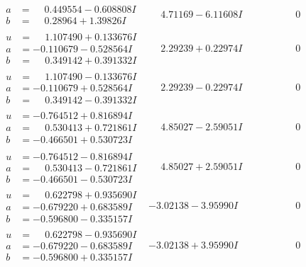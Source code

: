 \documentclass[1p]{elsarticle_modified}
\theoremstyle{definition}
\begin{document}
$$\begin{array}{c|c|c}
\begin{aligned}
a &= \phantom{-}0.449554 - 0.608808 I \\
b &= \phantom{-}0.28964 + 1.39826 I\end{aligned}
 & \phantom{-}4.71169 - 6.11608 I & \phantom{-0.000000 } 0 \\ \hline\begin{aligned}
u &= \phantom{-}1.107490 + 0.133676 I \\
a &= -0.110679 - 0.528564 I \\
b &= \phantom{-}0.349142 + 0.391332 I\end{aligned}
 & \phantom{-}2.29239 + 0.22974 I & \phantom{-0.000000 } 0 \\ \hline\begin{aligned}
u &= \phantom{-}1.107490 - 0.133676 I \\
a &= -0.110679 + 0.528564 I \\
b &= \phantom{-}0.349142 - 0.391332 I\end{aligned}
 & \phantom{-}2.29239 - 0.22974 I & \phantom{-0.000000 } 0 \\ \hline\begin{aligned}
u &= -0.764512 + 0.816894 I \\
a &= \phantom{-}0.530413 + 0.721861 I \\
b &= -0.466501 + 0.530723 I\end{aligned}
 & \phantom{-}4.85027 - 2.59051 I & \phantom{-0.000000 } 0 \\ \hline\begin{aligned}
u &= -0.764512 - 0.816894 I \\
a &= \phantom{-}0.530413 - 0.721861 I \\
b &= -0.466501 - 0.530723 I\end{aligned}
 & \phantom{-}4.85027 + 2.59051 I & \phantom{-0.000000 } 0 \\ \hline\begin{aligned}
u &= \phantom{-}0.622798 + 0.935690 I \\
a &= -0.679220 + 0.683589 I \\
b &= -0.596800 - 0.335157 I\end{aligned}
 & -3.02138 - 3.95990 I & \phantom{-0.000000 } 0 \\ \hline\begin{aligned}
u &= \phantom{-}0.622798 - 0.935690 I \\
a &= -0.679220 - 0.683589 I \\
b &= -0.596800 + 0.335157 I\end{aligned}
 & -3.02138 + 3.95990 I & \phantom{-0.000000 } 0\\

\end{array}$$
\end{document}
